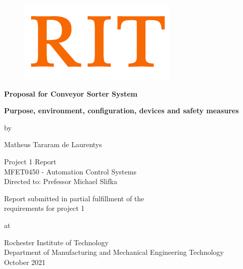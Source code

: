 \begin{titlepage}
\begin{figure}[H]
    \hspace*{-1.0cm}
    \vspace*{-0.5cm}
    \includegraphics[scale=1]{images/logo_rit.jpg}\\
\end{figure}

\begin{center}
    \vspace*{2cm}
    
    {\LARGE \textbf{Proposal for Conveyor Sorter System}}
    
    \vspace{0.5cm}
    \textbf{Purpose, environment, configuration, devices and safety measures}
    
	\vspace{1cm}
	 by
    \vspace{1cm}
    
   Matheus Tararam de Laurentys
\end{center}

\vspace{1cm}

\begin{center}   
	{\large Project 1 Report \\ 
		MFET0450 - Automation Control Systems} \\
	\vspace{0.5cm}
	Directed to: Prefessor Michael Slifka \\
	
\end{center}

\vspace{1cm}

\begin{center}
	Report submitted in partial fulfillment of the\\
	requirements for project 1

	\vspace{1.0cm}
	at
	\vspace{1cm}
	
	Rochester Institute of Technology \\
	Department of Manufacturing and Mechanical Engineering Technology \\
	October 2021
\end{center}

\end{titlepage}